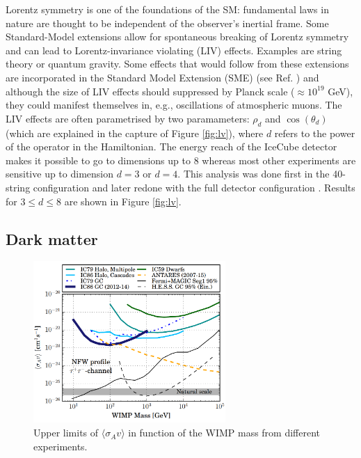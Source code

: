 Lorentz symmetry is one of the foundations of the SM: fundamental laws in nature are thought to be independent of the observer's inertial frame. Some Standard-Model extensions allow for spontaneous breaking of Lorentz symmetry and can lead to Lorentz-invariance violating (LIV) effects. Examples are string theory or quantum gravity. Some effects that would follow from these extensions are incorporated in the Standard Model Extension (SME) (see Ref. \cite{Colladay:1998fq}) and although the size of LIV effects should suppressed by Planck scale ($\approx 10^{19}$ GeV), they could manifest themselves in, e.g., oscillations of atmospheric muons. The LIV effects are often parametrised by two paramameters: $\rho_d$ and $\cos \left(\theta_d\right)$ (which are explained in the capture of Figure \ref{fig:lv}), where $d$ refers to the power of the operator in the Hamiltonian. The energy reach of the IceCube detector makes it possible to go to dimensions up to 8 whereas most other experiments are sensitive up to dimension $d=3$ or $d=4$. This analysis was done first in the 40-string configuration \cite{Abbasi:2010kx} and later redone with the full detector configuration \cite{Aartsen:2017ibm}. Results for $3 \leq d \leq 8$ are shown in Figure \ref{fig:lv}.

\subsection{Dark matter}
\label{subsubsec:DM}

\begin{figure}[ht]
\centering
\includegraphics[width=0.65\textwidth]{chapter5/img/dm.png}
\caption{Upper limits of $\langle \sigma_A v\rangle$ in function of the WIMP mass from different experiments.}
\label{fig:dm}
\end{figure}

